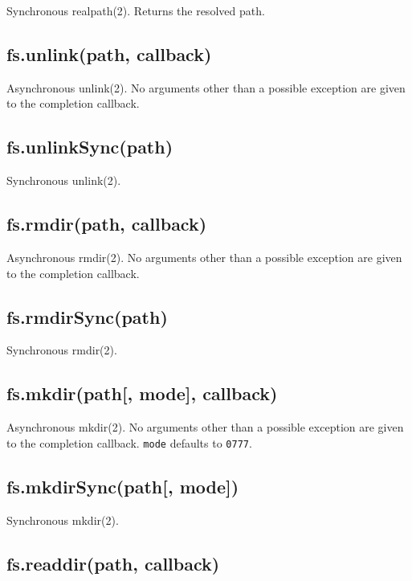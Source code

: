 Synchronous realpath(2). Returns the resolved path.

\subsection{fs.unlink(path, callback)}\label{fs.unlinkpath-callback}

Asynchronous unlink(2). No arguments other than a possible exception are
given to the completion callback.

\subsection{fs.unlinkSync(path)}\label{fs.unlinksyncpath}

Synchronous unlink(2).

\subsection{fs.rmdir(path, callback)}\label{fs.rmdirpath-callback}

Asynchronous rmdir(2). No arguments other than a possible exception are
given to the completion callback.

\subsection{fs.rmdirSync(path)}\label{fs.rmdirsyncpath}

Synchronous rmdir(2).

\subsection{fs.mkdir(path{[}, mode{]},
callback)}\label{fs.mkdirpath-mode-callback}

Asynchronous mkdir(2). No arguments other than a possible exception are
given to the completion callback. \texttt{mode} defaults to
\texttt{0777}.

\subsection{fs.mkdirSync(path{[}, mode{]})}\label{fs.mkdirsyncpath-mode}

Synchronous mkdir(2).

\subsection{fs.readdir(path, callback)}\label{fs.readdirpath-callback}

